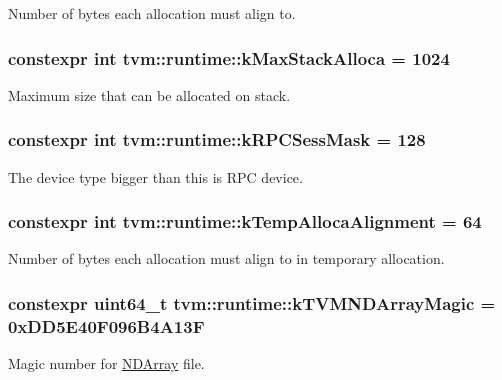 Number of bytes each allocation must align to. 

\subsubsection[{\texorpdfstring{k\+Max\+Stack\+Alloca}{kMaxStackAlloca}}]{\setlength{\rightskip}{0pt plus 5cm}constexpr int tvm\+::runtime\+::k\+Max\+Stack\+Alloca = 1024}\hypertarget{namespacetvm_1_1runtime_a2f6f769f6dbbbb24929b7c9f91a48c90}{}\label{namespacetvm_1_1runtime_a2f6f769f6dbbbb24929b7c9f91a48c90}


Maximum size that can be allocated on stack. 

\subsubsection[{\texorpdfstring{k\+R\+P\+C\+Sess\+Mask}{kRPCSessMask}}]{\setlength{\rightskip}{0pt plus 5cm}constexpr int tvm\+::runtime\+::k\+R\+P\+C\+Sess\+Mask = 128}\hypertarget{namespacetvm_1_1runtime_a48cbe06e6c95ca6fabc20dd1cbacc2c9}{}\label{namespacetvm_1_1runtime_a48cbe06e6c95ca6fabc20dd1cbacc2c9}


The device type bigger than this is R\+PC device. 

\subsubsection[{\texorpdfstring{k\+Temp\+Alloca\+Alignment}{kTempAllocaAlignment}}]{\setlength{\rightskip}{0pt plus 5cm}constexpr int tvm\+::runtime\+::k\+Temp\+Alloca\+Alignment = 64}\hypertarget{namespacetvm_1_1runtime_a8f5819cabea098a1818cf7cda40fdb1f}{}\label{namespacetvm_1_1runtime_a8f5819cabea098a1818cf7cda40fdb1f}


Number of bytes each allocation must align to in temporary allocation. 

\subsubsection[{\texorpdfstring{k\+T\+V\+M\+N\+D\+Array\+Magic}{kTVMNDArrayMagic}}]{\setlength{\rightskip}{0pt plus 5cm}constexpr uint64\+\_\+t tvm\+::runtime\+::k\+T\+V\+M\+N\+D\+Array\+Magic = 0x\+D\+D5\+E40\+F096\+B4\+A13F}\hypertarget{namespacetvm_1_1runtime_acf4599f17bfe79ae1fe8afc1af053b43}{}\label{namespacetvm_1_1runtime_acf4599f17bfe79ae1fe8afc1af053b43}


Magic number for \hyperlink{classtvm_1_1runtime_1_1NDArray}{N\+D\+Array} file. 

